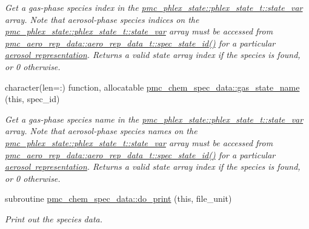 \begin{DoxyCompactItemize}
\begin{DoxyCompactList}\small\item\em Get a gas-\/phase species index in the {\ttfamily \mbox{\hyperlink{structpmc__phlex__state_1_1phlex__state__t_a78835cb552d483ebbfc7a6bc6f756918}{pmc\+\_\+phlex\+\_\+state\+::phlex\+\_\+state\+\_\+t\+::state\+\_\+var}}} array. Note that aerosol-\/phase species indices on the {\ttfamily \mbox{\hyperlink{structpmc__phlex__state_1_1phlex__state__t_a78835cb552d483ebbfc7a6bc6f756918}{pmc\+\_\+phlex\+\_\+state\+::phlex\+\_\+state\+\_\+t\+::state\+\_\+var}}} array must be accessed from {\ttfamily \mbox{\hyperlink{structpmc__aero__rep__data_1_1aero__rep__data__t_a6dcaf48caeaaed60aa065a0fac6c7ffc}{pmc\+\_\+aero\+\_\+rep\+\_\+data\+::aero\+\_\+rep\+\_\+data\+\_\+t\+::spec\+\_\+state\+\_\+id()}}} for a particular \mbox{\hyperlink{phlex_aero_rep}{aerosol representation}}. Returns a valid state array index if the species is found, or 0 otherwise. \end{DoxyCompactList}\item 
character(len=\+:) function, allocatable \mbox{\hyperlink{namespacepmc__chem__spec__data_a118f0f70c5bf5c1bba0651831083d2c1}{pmc\+\_\+chem\+\_\+spec\+\_\+data\+::gas\+\_\+state\+\_\+name}} (this, spec\+\_\+id)
\begin{DoxyCompactList}\small\item\em Get a gas-\/phase species name in the {\ttfamily \mbox{\hyperlink{structpmc__phlex__state_1_1phlex__state__t_a78835cb552d483ebbfc7a6bc6f756918}{pmc\+\_\+phlex\+\_\+state\+::phlex\+\_\+state\+\_\+t\+::state\+\_\+var}}} array. Note that aerosol-\/phase species names on the {\ttfamily \mbox{\hyperlink{structpmc__phlex__state_1_1phlex__state__t_a78835cb552d483ebbfc7a6bc6f756918}{pmc\+\_\+phlex\+\_\+state\+::phlex\+\_\+state\+\_\+t\+::state\+\_\+var}}} array must be accessed from {\ttfamily \mbox{\hyperlink{structpmc__aero__rep__data_1_1aero__rep__data__t_a6dcaf48caeaaed60aa065a0fac6c7ffc}{pmc\+\_\+aero\+\_\+rep\+\_\+data\+::aero\+\_\+rep\+\_\+data\+\_\+t\+::spec\+\_\+state\+\_\+id()}}} for a particular \mbox{\hyperlink{phlex_aero_rep}{aerosol representation}}. Returns a valid state array index if the species is found, or 0 otherwise. \end{DoxyCompactList}\item 
subroutine \mbox{\hyperlink{namespacepmc__chem__spec__data_a241ef4f3c9e0a1968b339df331ca8d64}{pmc\+\_\+chem\+\_\+spec\+\_\+data\+::do\+\_\+print}} (this, file\+\_\+unit)
\begin{DoxyCompactList}\small\item\em Print out the species data. \end{DoxyCompactList}\item 

\end{DoxyCompactItemize}
